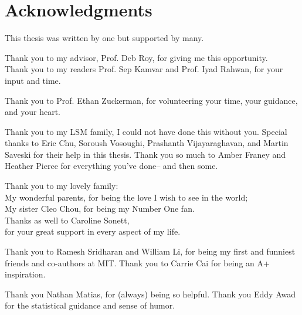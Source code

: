  
\section*{Acknowledgments}
 
 
This thesis was written by one but supported by many.

Thank you to my advisor, Prof. Deb Roy, for giving me this opportunity.\\
Thank you to my readers Prof. Sep Kamvar and Prof. Iyad Rahwan, for your input and time.

Thank you to Prof. Ethan Zuckerman, for volunteering your time, your guidance, and your heart. 


Thank you to my LSM family, I could not have done this without you. Special thanks to Eric Chu, Soroush Vosoughi, Prashanth Vijayaraghavan, and Martin Saveski for their help in this thesis. Thank you so much to Amber Franey and Heather Pierce for everything you've done-- and then some.


Thank you to my lovely family: \\
My wonderful parents, for being the love I wish to see in the world;  \\
My sister Cleo Chou, for being my Number One fan.  \\
Thanks as well to Caroline Sonett, \\ 
for your great support in every aspect of my life.
  
Thank you to Ramesh Sridharan and William Li, for being my first and funniest friends and co-authors at MIT. Thank you to Carrie Cai for being an A+ inspiration.

Thank you Nathan Matias, for (always) being so helpful. Thank you Eddy Awad for the statistical guidance and sense of humor. 

